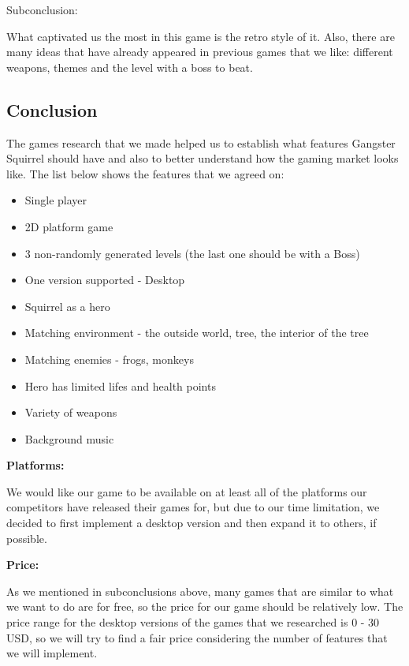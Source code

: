 \documentclass[12p]{article}
\begin{document}
Subconclusion:

What captivated us the most in this game is the retro style of it. Also, there are many ideas that have already appeared in previous games that we like: different weapons, themes and the level with a boss to beat.


\newpage
\subsection{Conclusion}

The games research that we made helped us to establish what features Gangster Squirrel should have and also to better understand how the gaming market looks like. The list below shows the features that we agreed on:

\begin{itemize}
  \item Single player
  \item 2D platform game
  \item 3 non-randomly generated levels (the last one should be with a Boss)
  \item One version supported - Desktop
  \item Squirrel as a hero
  \item Matching environment - the outside world, tree, the interior of the tree
  \item Matching enemies - frogs, monkeys
  \item Hero has limited lifes and health points 
  \item Variety of weapons
  \item Background music
\end{itemize}

\textbf{Platforms:}

We would like our game to be available on at least all of the platforms our competitors have released their games for, but due to our time limitation, we decided to first implement a desktop version and then expand it to others, if possible.

\textbf{Price:}

As we mentioned in subconclusions above, many games that are similar to what we want to do are for free, so the price for our game should be relatively low. The price range for the desktop versions of the games that we researched is 0 - 30 USD, so we will try to find a fair price considering the number of features that we will implement.
\end{document}
